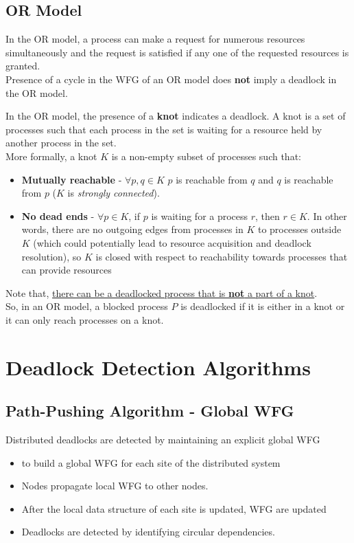 \subsection{OR Model}
In the OR model, a process can make a request for numerous resources simultaneously and the request is satisfied if any one of the requested resources is granted.\\
Presence of a cycle in the WFG of an OR model does \textbf{not} imply a deadlock in the OR model.

In the OR model, the presence of a \textbf{knot} indicates a deadlock.
A knot is a set of processes such that each process in the set is waiting for a resource held by another process in the set.\\
More formally, a knot $K$ is a non-empty subset of processes such that:
\begin{itemize}
      \item \textbf{Mutually reachable} - $\forall p,q \in K$ $p$ is reachable from $q$ and $q$ is reachable from $p$ ($K$ is \textit{strongly connected}).
      \item \textbf{No dead ends} - $\forall p \in K$, if $p$ is waiting for a process $r$, then $r \in K$. In other words, there are no outgoing edges from processes in $K$ to processes outside $K$ (which could potentially lead to resource acquisition and deadlock resolution), so $K$ is closed with respect to reachability towards processes that can provide resources
\end{itemize} 

Note that, \ul{there can be a deadlocked process that is \textbf{not} a part of a knot}.\\
So, in an OR model, a blocked process $P$ is deadlocked if it is either in a knot or it can only reach processes on a knot.

\section{Deadlock Detection Algorithms}
\subsection{Path-Pushing Algorithm - Global WFG}
Distributed deadlocks are detected by
maintaining an explicit global WFG
\begin{itemize}
	\item to build a global WFG for each site of the
distributed system
	\item Nodes propagate local WFG to other nodes.
	\item After the local data structure of each site is
updated, WFG are updated
	\item Deadlocks are detected by identifying circular
dependencies.
\end{itemize}

